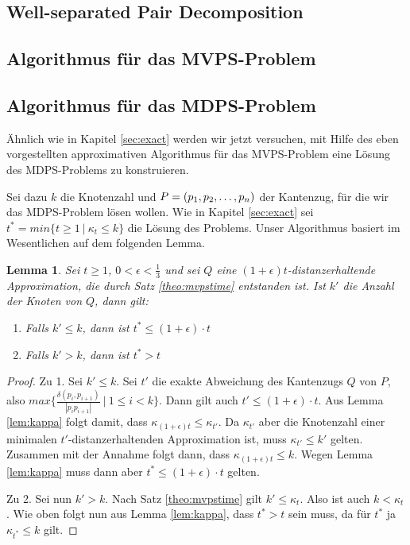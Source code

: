 \documentclass[11pt]{article}
\newtheorem{lemma}[theorem]{Lemma}
\begin{document}
    \subsection{Well-separated Pair Decomposition}
    \label{subsec:wspd}
    
    
    \subsection{Algorithmus für das MVPS-Problem}
    \label{subsec:mvps}
	
    
    \subsection{Algorithmus für das MDPS-Problem}
    \label{subsec:mdps}
	Ähnlich wie in Kapitel \ref{sec:exact} werden wir jetzt versuchen, mit Hilfe des eben vorgestellten approximativen Algorithmus für das MVPS-Problem eine Lösung des MDPS-Problems zu konstruieren.
	
	Sei dazu $k$ die Knotenzahl und $P = (p_1, p_2, \mathellipsis, p_n)$ der Kantenzug, für die wir das MDPS-Problem lösen wollen. 
	Wie in Kapitel \ref{sec:exact} sei $t^* = min\{t \geq 1\ |\ \kappa_t \leq k\}$ die Lösung des Problems. 
	Unser Algorithmus basiert im Wesentlichen auf dem folgenden Lemma.
	
	\begin{lemma}
		\label{lem:tstar}
		Sei $t \geq 1$, $0 < \epsilon < \frac{1}{3}$ und sei $Q$ eine $(1 + \epsilon)t$-distanzerhaltende Approximation, die durch Satz \ref{theo:mvpstime} entstanden ist. Ist $k'$ die Anzahl der Knoten von $Q$, dann gilt:
		\begin{enumerate}
			\item Falls $k' \leq k$, dann ist $t^* \leq (1 + \epsilon) \cdot t$
			\item Falls $k' > k$, dann ist $t^* > t$
		\end{enumerate}
	\end{lemma}
	\begin{proof}
		Zu 1. Sei $k' \leq k$. Sei $t'$ die exakte Abweichung des Kantenzugs $Q$ von $P$, also $max\{\frac{\delta(p_i, p_{i+1})}{|p_ip_{i+1}|}\ |\ 1 \leq i < k\}$. 
		Dann gilt auch $t' \leq (1 + \epsilon) \cdot t$. 
		Aus Lemma \ref{lem:kappa} folgt damit, dass $\kappa_{(1 + \epsilon)t} \leq \kappa_{t'}$.
		Da $\kappa_{t'}$ aber die Knotenzahl einer minimalen $t'$-distanzerhaltenden Approximation ist, muss $\kappa_{t'} \leq k'$ gelten. Zusammen mit der Annahme folgt dann, dass $\kappa_{(1 + \epsilon)t} \leq k$. Wegen Lemma \ref{lem:kappa} muss dann aber $t^* \leq (1 + \epsilon) \cdot t$ gelten.
		
		Zu 2. Sei nun $k' > k$. Nach Satz \ref{theo:mvpstime} gilt $k' \leq \kappa_t$. Also ist auch $k < \kappa_t$. Wie oben folgt nun aus Lemma \ref{lem:kappa}, dass $t^* > t$ sein muss, da für $t^*$ ja $\kappa_{t^*} \leq k$ gilt.		
	\end{proof}
	
\end{document}
